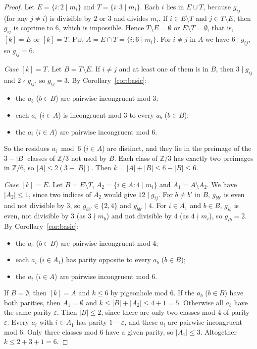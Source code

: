 \documentclass[11pt]{article}
\theoremstyle{remark}
\theoremstyle{definition}
\begin{document}
\begin{proof}
Let $E=\{i:2\mid m_i\}$ and $T=\{i:3\mid m_i\}$. Each $i$ lies in $E\cup T$, because $g_{ij}$ (for any
$j\ne i$) is divisible by $2$ or $3$ and divides $m_i$. If $i\in E\setminus T$ and $j\in T\setminus E$, then
$g_{ij}$ is coprime to $6$, which is impossible. Hence $T\setminus E=\emptyset$ or $E\setminus T=\emptyset$, that is,
$[k]=E$ or $[k]=T$. Put $A=E\cap T=\{i:6\mid m_i\}$. For $i\ne j$ in $A$ we have $6\mid g_{ij}$, so
$g_{ij}=6$.

\emph{Case $[k]=T$.} Let $B=T\setminus E$. If $i\ne j$ and at least one of them is in $B$, then $3\mid g_{ij}$
and $2\nmid g_{ij}$, so $g_{ij}=3$. By Corollary~\ref{cor:basic}:
\begin{itemize}
\item the $a_b$ ($b\in B$) are pairwise incongruent mod $3$;
\item each $a_i$ ($i\in A$) is incongruent mod $3$ to every $a_b$ ($b\in B$);
\item the $a_i$ ($i\in A$) are pairwise incongruent mod $6$.
\end{itemize}
So the residues $a_i\bmod6$ ($i\in A$) are distinct, and they lie in the preimage of the
$3-|B|$ classes of $\mathbb{Z}/3$ not used by $B$. Each class of $\mathbb{Z}/3$ has exactly two
preimages in $\mathbb{Z}/6$, so $|A|\le2(3-|B|)$. Then $k=|A|+|B|\le6-|B|\le6$.

\emph{Case $[k]=E$.} Let $B=E\setminus T$, $A_2=\{i\in A:4\mid m_i\}$ and $A_1=A\setminus A_2$. We have
$|A_2|\le1$, since two indices of $A_2$ would give $12\mid g_{ij}$. For $b\ne b'$ in $B$, $g_{bb'}$ is
even and not divisible by $3$, so $g_{bb'}\in\{2,4\}$ and $g_{bb'}\mid4$. For $i\in A_1$ and $b\in B$,
$g_{ib}$ is even, not divisible by $3$ (as $3\nmid m_b$) and not divisible by $4$ (as $4\nmid m_i$), so
$g_{ib}=2$. By Corollary~\ref{cor:basic}:
\begin{itemize}
\item the $a_b$ ($b\in B$) are pairwise incongruent mod $4$;
\item each $a_i$ ($i\in A_1$) has parity opposite to every $a_b$ ($b\in B$);
\item the $a_i$ ($i\in A$) are pairwise incongruent mod $6$.
\end{itemize}
If $B=\emptyset$, then $[k]=A$ and $k\le6$ by pigeonhole mod $6$. If the $a_b$ ($b\in B$) have both
parities, then $A_1=\emptyset$ and $k\le|B|+|A_2|\le4+1=5$. Otherwise all $a_b$ have the same parity
$\varepsilon$. Then $|B|\le2$, since there are only two classes mod $4$ of parity $\varepsilon$. Every
$a_i$ with $i\in A_1$ has parity $1-\varepsilon$, and these $a_i$ are pairwise incongruent mod $6$. Only
three classes mod $6$ have a given parity, so $|A_1|\le3$. Altogether $k\le2+3+1=6$.
\end{proof}
\end{document}
